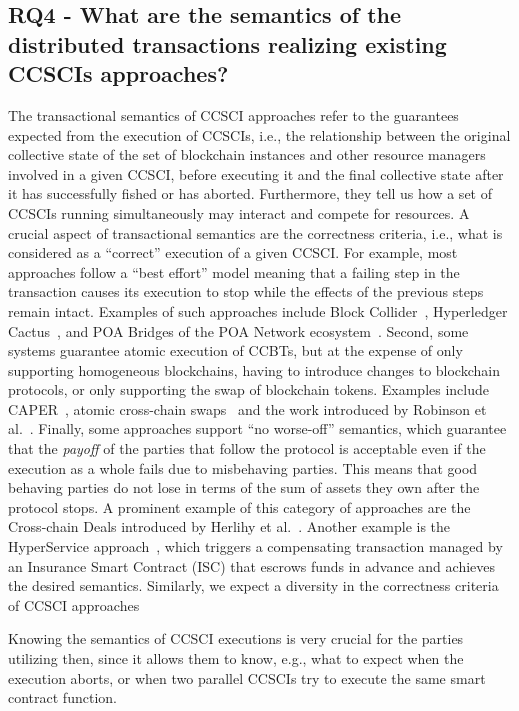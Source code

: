 \documentclass[review]{elsarticle}
\begin{document}
\subsection*{RQ4 - What are the semantics of the distributed transactions realizing existing CCSCIs approaches?}
The transactional semantics of CCSCI approaches refer to the guarantees expected from the execution of CCSCIs, i.e., the relationship between the original collective state of the set of blockchain instances and other resource managers involved in a given CCSCI, before executing it and the final collective state after it has successfully fished or has aborted.
Furthermore, they tell us how a set of CCSCIs running simultaneously may interact and compete for resources.
A crucial aspect of transactional semantics are the correctness criteria, i.e., what is considered as a \enquote{correct} execution of a given CCSCI.
For example, most approaches follow a \enquote{best effort} model meaning that a failing step in the transaction causes its execution to stop while the effects of the previous steps remain intact.
Examples of such approaches include Block Collider~\cite{Jain2018Collider}, Hyperledger Cactus~\cite{Montgomery2020Cactus}, and POA Bridges of the POA Network ecosystem~\cite{Barinov2018POA}.
Second, some systems guarantee atomic execution of CCBTs, but at the expense of only supporting homogeneous blockchains, having to introduce changes to blockchain protocols, or only supporting the swap of blockchain tokens.
Examples include CAPER~\cite{Amiri2019CAPER}, atomic cross-chain swaps~\cite{Herlihy2018AtomicCCSwaps} and the work introduced by Robinson et al.~\cite{Robinson2020AtomicCCTx}.
Finally, some approaches support \enquote{no worse-off} semantics, which guarantee that the \textit{payoff} of the parties that follow the protocol is acceptable even if the execution as a whole fails due to misbehaving parties.
This means that good behaving parties do not lose in terms of the sum of assets they own after the protocol stops.
A prominent example of this category of approaches are the Cross-chain Deals introduced by Herlihy et al.~\cite{Herlihy2019CCDeals}.
Another example is the HyperService approach~\cite{Liu2019Hyperservice}, which triggers a compensating transaction managed by an Insurance Smart Contract (ISC) that escrows funds in advance and achieves the desired semantics.
Similarly, we expect a diversity in the correctness criteria of CCSCI approaches

Knowing the semantics of CCSCI executions is very crucial for the parties utilizing then, since it allows them to know, e.g., what to expect when the execution aborts, or when two parallel CCSCIs try to execute the same smart contract function.
\end{document}
